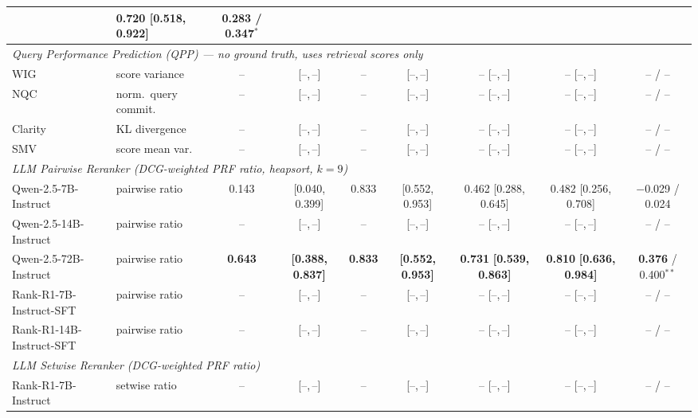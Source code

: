 \begin{table}[htbp]
{\begin{tabular}{@{}llccccccc@{}}
  & 0.720 {[0.518, 0.922]}
  & 0.283 / 0.347$^{*}$ \\
\midrule
\multicolumn{9}{l}{\textit{Query Performance Prediction (QPP) --- no ground truth, uses retrieval scores only}} \\[2pt]
WIG~\cite{zhou2007query}      & score variance
  & -- & {[--,\,--]} & -- & {[--,\,--]} & -- {[--,\,--]} & -- {[--,\,--]} & -- / -- \\
NQC~\cite{shtok2012predicting} & norm.\ query commit.
  & -- & {[--,\,--]} & -- & {[--,\,--]} & -- {[--,\,--]} & -- {[--,\,--]} & -- / -- \\
Clarity~\cite{cronen2002predicting} & KL divergence
  & -- & {[--,\,--]} & -- & {[--,\,--]} & -- {[--,\,--]} & -- {[--,\,--]} & -- / -- \\
SMV~\cite{tao2014query}        & score mean var.
  & -- & {[--,\,--]} & -- & {[--,\,--]} & -- {[--,\,--]} & -- {[--,\,--]} & -- / -- \\
\midrule
\multicolumn{9}{l}{\textit{LLM Pairwise Reranker (DCG-weighted PRF ratio, heapsort, $k{=}9$)}} \\[2pt]
Qwen-2.5-7B-Instruct   & pairwise ratio
  & 0.143 & {[0.040, 0.399]}
  & 0.833 & {[0.552, 0.953]}
  & 0.462 {[0.288, 0.645]}
  & 0.482 {[0.256, 0.708]}
  & $-$0.029 / 0.024 \\
Qwen-2.5-14B-Instruct  & pairwise ratio
  & -- & {[--,\,--]} & -- & {[--,\,--]} & -- {[--,\,--]} & -- {[--,\,--]} & -- / -- \\
Qwen-2.5-72B-Instruct  & pairwise ratio
  & \textbf{0.643} & \textbf{[0.388, 0.837]}
  & \textbf{0.833} & \textbf{[0.552, 0.953]}
  & \textbf{0.731} \textbf{[0.539, 0.863]}
  & \textbf{0.810} \textbf{[0.636, 0.984]}
  & \textbf{0.376} / 0.400$^{**}$ \\
Rank-R1-7B-Instruct-SFT   & pairwise ratio
  & -- & {[--,\,--]} & -- & {[--,\,--]} & -- {[--,\,--]} & -- {[--,\,--]} & -- / -- \\
Rank-R1-14B-Instruct-SFT  & pairwise ratio
  & -- & {[--,\,--]} & -- & {[--,\,--]} & -- {[--,\,--]} & -- {[--,\,--]} & -- / -- \\
\midrule
\multicolumn{9}{l}{\textit{LLM Setwise Reranker (DCG-weighted PRF ratio)}} \\[2pt]
Rank-R1-7B-Instruct    & setwise ratio
  & -- & {[--,\,--]} & -- & {[--,\,--]} & -- {[--,\,--]} & -- {[--,\,--]} & -- / -- \\

\end{tabular}}
\end{table}
